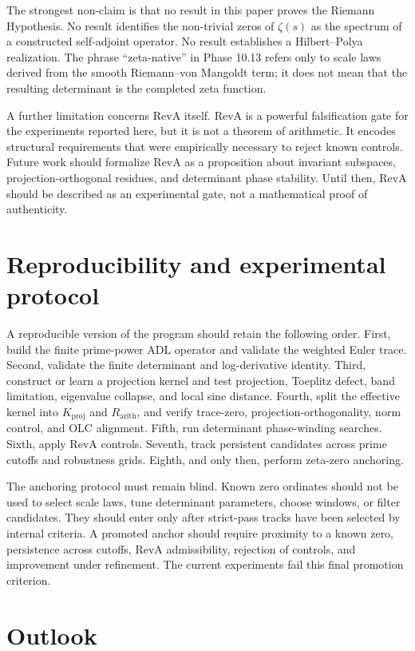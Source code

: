 \documentclass[11pt]{article}
\newcommand{\Rarith}{R_{\mathrm{arith}}}
\newcommand{\Kproj}{K_{\mathrm{proj}}}
\theoremstyle{definition}
\theoremstyle{plain}
\begin{document}
The strongest non-claim is that no result in this paper proves the Riemann Hypothesis.  No result identifies the non-trivial zeros of $\zeta(s)$ as the spectrum of a constructed self-adjoint operator.  No result establishes a Hilbert--Polya realization.  The phrase ``zeta-native'' in Phase 10.13 refers only to scale laws derived from the smooth Riemann--von Mangoldt term; it does not mean that the resulting determinant is the completed zeta function.

A further limitation concerns RevA itself.  RevA is a powerful falsification gate for the experiments reported here, but it is not a theorem of arithmetic.  It encodes structural requirements that were empirically necessary to reject known controls.  Future work should formalize RevA as a proposition about invariant subspaces, projection-orthogonal residues, and determinant phase stability.  Until then, RevA should be described as an experimental gate, not a mathematical proof of authenticity.

\section{Reproducibility and experimental protocol}

A reproducible version of the program should retain the following order.  First, build the finite prime-power ADL operator and validate the weighted Euler trace.  Second, validate the finite determinant and log-derivative identity.  Third, construct or learn a projection kernel and test projection, Toeplitz defect, band limitation, eigenvalue collapse, and local sine distance.  Fourth, split the effective kernel into $\Kproj$ and $\Rarith$, and verify trace-zero, projection-orthogonality, norm control, and OLC alignment.  Fifth, run determinant phase-winding searches.  Sixth, apply RevA controls.  Seventh, track persistent candidates across prime cutoffs and robustness grids.  Eighth, and only then, perform zeta-zero anchoring.

The anchoring protocol must remain blind.  Known zero ordinates should not be used to select scale laws, tune determinant parameters, choose windows, or filter candidates.  They should enter only after strict-pass tracks have been selected by internal criteria.  A promoted anchor should require proximity to a known zero, persistence across cutoffs, RevA admissibility, rejection of controls, and improvement under refinement.  The current experiments fail this final promotion criterion.

\section{Outlook}
\end{document}
